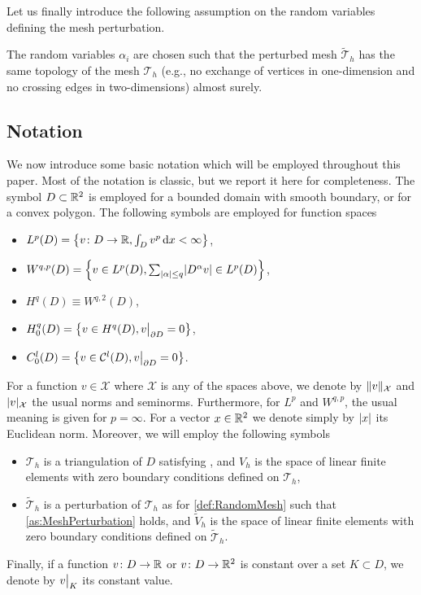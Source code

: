 Let us finally introduce the following assumption on the random variables defining the mesh perturbation. 
\begin{assumption} \label{as:MeshPerturbation}  The random variables $\alpha_i$ are chosen such that the perturbed mesh $\widetilde {\mathcal T}_h$ has the same topology of the mesh $\mathcal T_h$ (e.g., no exchange of vertices in one-dimension and no crossing edges in two-dimensions) almost surely.  
\end{assumption}

\subsection{Notation}

We now introduce some basic notation which will be employed throughout this paper. Most of the notation is classic, but we report it here for completeness. The symbol $D \subset \mathbb{R}^2$ is employed for a bounded domain with smooth boundary, or for a convex polygon. The following symbols are employed for function spaces
\begin{itemize}
	\item $L^p(D) = \left\{v\colon D \to \mathbb{R}, \int_D v^p \,\mathrm{d} x< \infty \right\}$,
	\item $W^{q, p}(D) = \left\{v \in L^p(D), \sum_{\lvert\alpha\rvert\leq q} \lvert D^{\alpha} v\rvert \in L^p(D) \right\}$,
	\item $H^q(D) \equiv W^{q,2}(D)$,
	\item $H^q_0(D) = \left\{v \in H^q(D), v\bigr\rvert_{\partial D} = 0\right\}$,
	\item $C^l_0(D) = \left\{v \in \mathcal C^l(D), v\bigr\rvert_{\partial D} = 0\right\}$.
\end{itemize}
For a function $v \in \mathcal X$ where $\mathcal X$ is any of the spaces above, we denote by $\lVert v\rVert_{\mathcal X}$ and $\lvert v\rvert_{\mathcal X}$ the usual norms and seminorms. Furthermore, for $L^p$ and $W^{q,p}$, the usual meaning is given for $p = \infty$. For a vector $x \in \mathbb{R}^2$ we denote simply by $\lvert x\rvert$ its Euclidean norm. Moreover, we will employ the following symbols
\begin{itemize}
	\item $\mathcal T_h$ is a triangulation of $D$ satisfying , and $V_h$ is the space of linear finite elements with zero boundary conditions defined on $\mathcal T_h$,
	\item $\widetilde{\mathcal T}_h$ is a perturbation of $\mathcal T_h$ as for \cref{def:RandomMesh} such that \cref{as:MeshPerturbation} holds, and $\widetilde V_h$ is the space of linear finite elements with zero boundary conditions defined on $\widetilde{\mathcal T}_h$.
\end{itemize}
Finally, if a function $v \colon D \to \mathbb{R}$ or $v \colon D \to \mathbb{R}^2$ is constant over a set $K \subset D$, we denote by $v\bigr\rvert_{K}$ its constant value.

